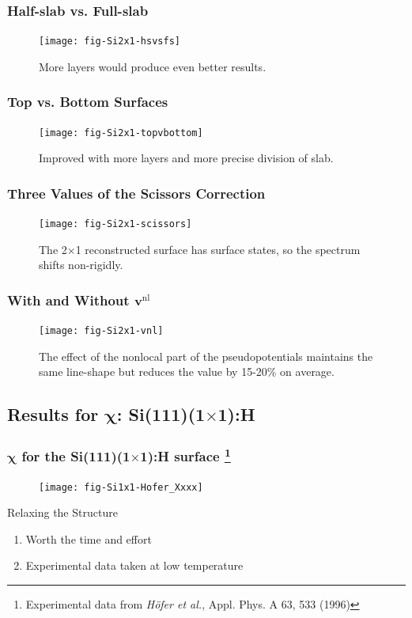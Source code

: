 \documentclass{beamer}
\begin{document}
\begin{frame}
\frametitle{Half-slab vs. Full-slab}
\begin{figure}
\centering
\texttt{[image: fig-Si2x1-hsvsfs]}
\caption{More layers would produce even better results.}
\end{figure}
\end{frame}

\begin{frame}
\frametitle{Top vs. Bottom Surfaces}
\begin{figure}
\centering
\texttt{[image: fig-Si2x1-topvbottom]}
\caption{Improved with more layers and more precise division of slab.}
\end{figure}
\end{frame}

\begin{frame}
\frametitle{Three Values of the Scissors Correction}
\begin{figure}
\centering
\texttt{[image: fig-Si2x1-scissors]}
\caption{The 2$\times$1 reconstructed surface has surface states, so the
spectrum shifts non-rigidly.}
\end{figure}
\end{frame}

\begin{frame}
\frametitle{With and Without \texorpdfstring{$\mathbf{v}^{\mathrm{nl}}$}{vnl}}
\begin{figure}
\centering
\texttt{[image: fig-Si2x1-vnl]}
\caption{The effect of the nonlocal part of the pseudopotentials maintains the
same line-shape but reduces the value by 15-20\% on average.}
\end{figure}
\end{frame}



\subsection{Results for \texorpdfstring{$\boldsymbol{\chi}$}{X}:
\texorpdfstring{Si(111)(1$\times$1):H}{Si(111)(1x1):H}}

\begin{frame}
\frametitle{$\boldsymbol{\chi}$ for the Si(111)(1$\times$1):H surface%
\footnote{Experimental data from \emph{H\"ofer et al.}, 
Appl. Phys. A 63, 533 (1996)}}
\vspace{-0.5cm}
\begin{figure}
\centering
\texttt{[image: fig-Si1x1-Hofer\_Xxxx]}
\end{figure}
\vspace{-0.5cm}
\begin{block}{Relaxing the Structure}
\begin{enumerate}
\item Worth the time and effort
\item Experimental data taken at low temperature
\end{enumerate}
\end{block}
\end{frame}
\end{document}
